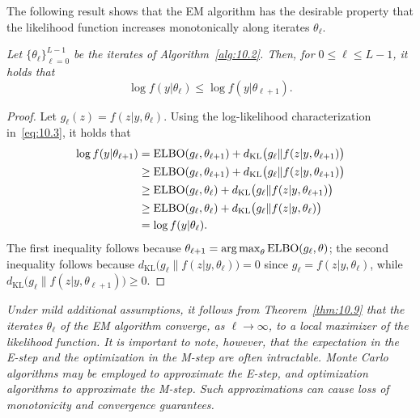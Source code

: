 The following result shows that the EM algorithm has the desirable property that the likelihood
function increases monotonically along iterates $\theta_\ell$.

\begin{theorem}
  \label{thm:10.9}
  \textit{Let $\{\theta_\ell\}_{\ell=0}^{L-1}$ be the iterates of Algorithm~\ref{alg:10.2}. Then,
  for $0 \leq \ell \leq L-1$, it holds that}
  \begin{equation}
    \log f(y|\theta_\ell) \leq \log f(y|\theta_{\ell+1}).
    \label{eq:10.5}
  \end{equation}
\end{theorem}

\begin{proof}
Let $g_\ell(z) = f(z|y, \theta_\ell)$. Using the log-likelihood characterization in~\eqref{eq:10.3},
it holds that
\begin{align*}
  \log f(y|\theta_{\ell+1})
    &= \mathrm{ELBO}(g_\ell, \theta_{\ell+1}) + d_{\mathrm{KL}}\bigl(g_\ell\|f(z|y,\theta_{\ell+1})\bigr) \\
    &\geq \mathrm{ELBO}(g_\ell, \theta_{\ell+1}) + d_{\mathrm{KL}}\bigl(g_\ell\|f(z|y,\theta_{\ell+1})\bigr) \\
    &\geq \mathrm{ELBO}(g_\ell, \theta_\ell) + d_{\mathrm{KL}}\bigl(g_\ell\|f(z|y,\theta_{\ell+1})\bigr) \\
    &\geq \mathrm{ELBO}(g_\ell, \theta_\ell) + d_{\mathrm{KL}}\bigl(g_\ell\|f(z|y,\theta_\ell)\bigr) \\
    &= \log f(y|\theta_\ell).
\end{align*}
The first inequality follows because $\theta_{\ell+1} = \operatorname*{arg\,max}_\theta \mathrm{ELBO}(g_\ell, \theta)$; the
second inequality follows because $d_{\mathrm{KL}}\bigl(g_\ell\|f(z|y,\theta_\ell)\bigr) = 0$ since
$g_\ell = f(z|y,\theta_\ell)$, while $d_{\mathrm{KL}}\bigl(g_\ell\|f(z|y,\theta_{\ell+1})\bigr) \geq 0$.
\end{proof}

\begin{remark}
  \label{rem:10.10}
  \textit{Under mild additional assumptions, it follows from Theorem~\ref{thm:10.9} that the
  iterates $\theta_\ell$ of the EM algorithm converge, as $\ell \to \infty$, to a local maximizer
  of the likelihood function. It is important to note, however, that the expectation in the E-step
  and the optimization in the M-step are often intractable. Monte Carlo algorithms may be employed
  to approximate the E-step, and optimization algorithms to approximate the M-step. Such
  approximations can cause loss of monotonicity and convergence guarantees.}
\end{remark}


